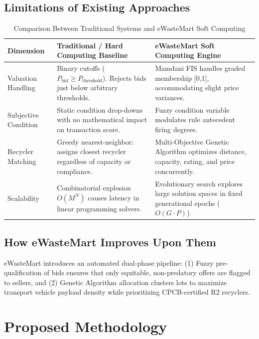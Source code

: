 \documentclass[12pt,a4paper]{article}
\begin{document}
\subsection{Limitations of Existing Approaches}
\begin{table}[H]
\centering
\small
\caption{Comparison Between Traditional Systems and eWasteMart Soft Computing}
\label{tab:lit_comparison}
\begin{tabularx}{\textwidth}{p{3.2cm}Xp{4.8cm}}
\toprule
\textbf{Dimension} & \textbf{Traditional / Hard Computing Baseline} & \textbf{eWasteMart Soft Computing Engine} \\
\midrule
Valuation Handling & Binary cutoffs ($P_{\text{bid}} \ge P_{\text{threshold}}$). Rejects bids just below arbitrary thresholds. & Mamdani FIS handles graded membership [0,1], accommodating slight price variances. \\
Subjective Condition & Static condition drop-downs with no mathematical impact on transaction score. & Fuzzy condition variable modulates rule antecedent firing degrees. \\
Recycler Matching & Greedy nearest-neighbor: assigns closest recycler regardless of capacity or compliance. & Multi-Objective Genetic Algorithm optimizes distance, capacity, rating, and price concurrently. \\
Scalability & Combinatorial explosion $O(M^N)$ causes latency in linear programming solvers. & Evolutionary search explores large solution spaces in fixed generational epochs ($O(G \cdot P)$). \\
\bottomrule
\end{tabularx}
\end{table}

\subsection{How eWasteMart Improves Upon Them}
eWasteMart introduces an automated dual-phase pipeline: (1) Fuzzy pre-qualification of bids ensures that only equitable, non-predatory offers are flagged to sellers, and (2) Genetic Algorithm allocation clusters lots to maximize transport vehicle payload density while prioritizing CPCB-certified R2 recyclers.

\section{Proposed Methodology}
\end{document}
